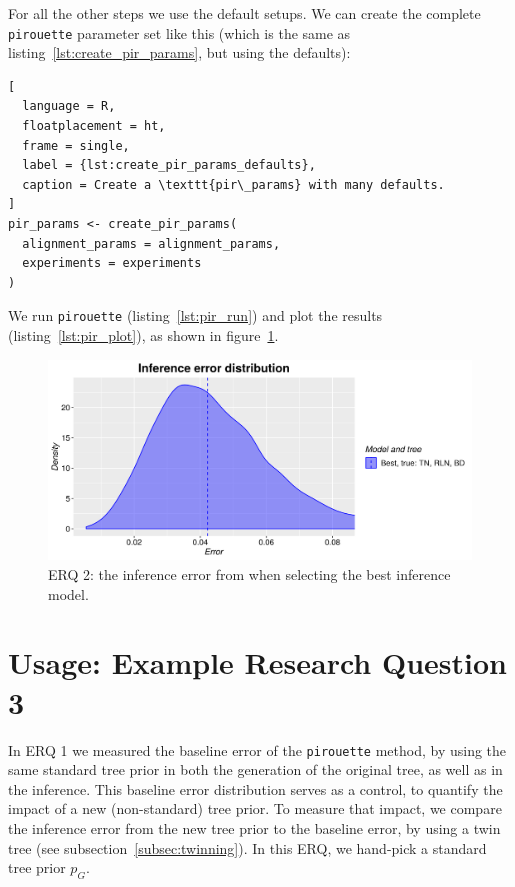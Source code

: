 \documentclass{article}
\begin{document}
For all the other steps we use the default setups. 
We can create the complete
\verb;pirouette; parameter set like this (which is the
same as listing~\ref{lst:create_pir_params}, but using the defaults):

\begin{lstlisting}[
  language = R,
  floatplacement = ht,
  frame = single,
  label = {lst:create_pir_params_defaults},
  caption = Create a \texttt{pir\_params} with many defaults.
]
pir_params <- create_pir_params(
  alignment_params = alignment_params,
  experiments = experiments
)
\end{lstlisting}

We run \verb;pirouette; (listing~\ref{lst:pir_run}) 
and plot the results (listing~\ref{lst:pir_plot}),
as shown in figure~\ref{fig:example_2}.

\begin{figure}[H]
  \includegraphics[width=\textwidth]{example_2/errors.png}
  \caption{
    ERQ 2: the inference error from
    when selecting the best inference model.
  }
  \label{fig:example_2}
\end{figure}

\section{Usage: Example Research Question 3}

In ERQ 1 we measured the baseline error of the \verb;pirouette; method,
by using the same standard tree prior in both the generation of 
the original tree, as well as in the inference.
This baseline error distribution serves as a control,
to quantify the impact of a new (non-standard) tree prior.
To measure that impact, we compare the inference error 
from the new tree prior to the baseline error,
by using a twin tree (see subsection~\ref{subsec:twinning}).
In this ERQ, we hand-pick a standard tree prior $\mathit{p_{G}}$.
\end{document}
